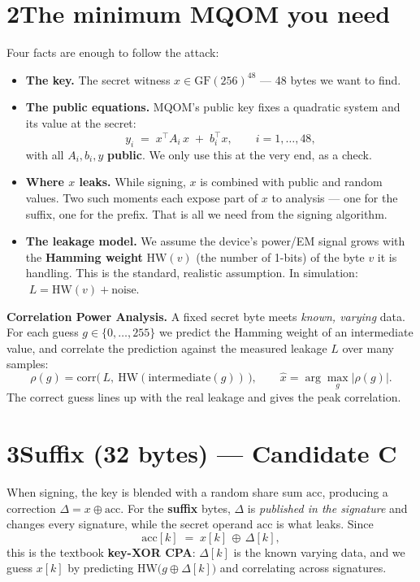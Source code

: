 \documentclass[11pt]{article}
\newcommand{\gf}{\mathrm{GF}(256)}
\newcommand{\hw}{\mathrm{HW}}
\newcommand{\xor}{\oplus}
\begin{document}
\section*{2\quad The minimum MQOM you need}
Four facts are enough to follow the attack:
\begin{itemize}
\item \textbf{The key.} The secret witness $x\in\gf^{48}$ --- 48 bytes we want to find.
\item \textbf{The public equations.} MQOM's public key fixes a quadratic system and its value
at the secret:
\[
 y_i \;=\; x^{\!\top} A_i\,x \;+\; b_i^{\!\top} x,\qquad i=1,\dots,48,
\]
with all $A_i,b_i,y$ \textbf{public}. We only use this at the very end, as a check.
\item \textbf{Where $x$ leaks.} While signing, $x$ is combined with public and random values.
Two such moments each expose part of $x$ to analysis --- one for the suffix, one for the
prefix. That is all we need from the signing algorithm.
\item \textbf{The leakage model.} We assume the device's power/EM signal grows with the
\textbf{Hamming weight} $\hw(v)$ (the number of 1-bits) of the byte $v$ it is handling. This
is the standard, realistic assumption. In simulation: $\;L=\hw(v)+\text{noise}$.
\end{itemize}

\begin{keybox}
\textbf{Correlation Power Analysis.} A fixed secret byte meets \emph{known, varying} data.
For each guess $g\in\{0,\dots,255\}$ we predict the Hamming weight of an intermediate value,
and correlate the prediction against the measured leakage $L$ over many samples:
\[
 \rho(g)=\mathrm{corr}\big(\,L,\ \hw(\text{intermediate}(g))\,\big),\qquad
 \hat{x}= \arg\max_g |\rho(g)|.
\]
The correct guess lines up with the real leakage and gives the peak correlation.
\end{keybox}

\section*{3\quad Suffix (32 bytes) --- Candidate C}
When signing, the key is blended with a random share sum $\mathrm{acc}$, producing a
correction $\Delta = x \xor \mathrm{acc}$. For the \textbf{suffix} bytes, $\Delta$ is
\emph{published in the signature} and changes every signature, while the secret operand
$\mathrm{acc}$ is what leaks. Since
\[
 \mathrm{acc}[k] \;=\; x[k]\,\xor\,\Delta[k],
\]
this is the textbook \textbf{key-XOR CPA}: $\Delta[k]$ is the known varying data, and we guess
$x[k]$ by predicting $\hw\big(g \xor \Delta[k]\big)$ and correlating across signatures.
\end{document}
